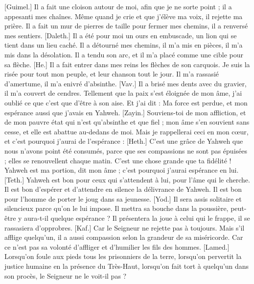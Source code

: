 \begin{multicols}{2}
[Guimel.] Il a fait une cloison autour de moi, afin que je ne sorte point ; il a appesanti mes chaînes.
Même quand je crie et que j'élève ma voix, il rejette ma prière.
Il a fait un mur de pierres de taille pour fermer mes chemins, il a renversé mes sentiers.
[Daleth.] Il a été pour moi un ours en embuscade, un lion qui se tient dans un lieu caché.
Il a détourné mes chemins, il m'a mis en pièces, il m'a mis dans la désolation.
Il a tendu son arc, et il m'a placé comme une cible pour sa flèche.
[He.] Il a fait entrer dans mes reins les flèches de son carquois.
Je suis la risée pour tout mon peuple, et leur chanson tout le jour.
Il m'a rassasié d'amertume, il m'a enivré d'absinthe.
[Vav.] Il a brisé mes dents avec du gravier, il m'a couvert de cendres.
Tellement que la paix s'est éloignée de mon âme, j'ai oublié ce que c'est que d'être à son aise.
Et j'ai dit : Ma force est perdue, et mon espérance aussi que j'avais en Yahweh.
[Zayin.] Souviens-toi de mon affliction, et de mon pauvre état qui n'est qu'absinthe et que fiel ;
mon âme s'en souvient sans cesse, et elle est abattue au-dedans de moi.
Mais je rappellerai ceci en mon cœur, et c'est pourquoi j'aurai de l'espérance :
[Heth.] C'est une grâce de Yahweh que nous n'avons point été consumés, parce que ses compassions ne sont pas épuisées ;
elles se renouvellent chaque matin. C'est une chose grande que ta fidélité !
Yahweh est ma portion, dit mon âme ; c'est pourquoi j'aurai espérance en lui.
[Teth.] Yahweh est bon pour ceux qui s'attendent à lui, pour l'âme qui le cherche.
Il est bon d'espérer et d'attendre en silence la délivrance de Yahweh.
Il est bon pour l'homme de porter le joug dans sa jeunesse.
[Yod.] Il sera assis solitaire et silencieux parce qu'on le lui impose.
Il mettra sa bouche dans la poussière, peut-être y aura-t-il quelque espérance ?
Il présentera la joue à celui qui le frappe, il se rassasiera d'opprobres.
[Kaf.] Car le Seigneur ne rejette pas à toujours.
Mais s'il afflige quelqu'un, il a aussi compassion selon la grandeur de sa miséricorde.
Car ce n'est pas sa volonté d'affliger et d'humilier les fils des hommes.
[Lamed.] Lorsqu'on foule aux pieds tous les prisonniers de la terre,
lorsqu'on pervertit la justice humaine en la présence du Très-Haut,
lorsqu'on fait tort à quelqu'un dans son procès, le Seigneur ne le voit-il pas ?

\end{multicols}

